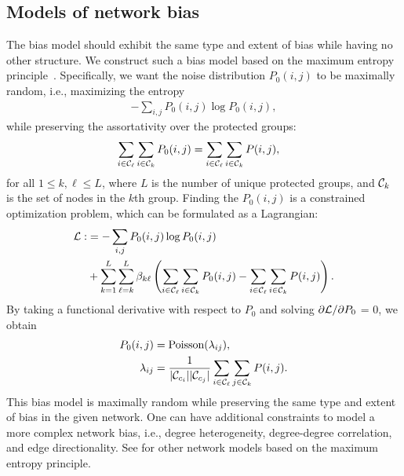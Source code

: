 \documentclass{article}
\theoremstyle{plain}
\theoremstyle{definition}
\theoremstyle{remark}
\begin{document}
\subsection{Models of network bias}

The bias model should exhibit the same type and extent of bias while having no other structure.
We construct such a bias model based on the maximum entropy principle~\cite{cimini2019statistical,bardoscia2021physics}.
Specifically, we want the noise distribution $P_0(i,j)$ to be maximally random, i.e., maximizing the entropy  
\begin{align}
-\sum_{i,j} P_0(i,j) \log P_0(i,j),
\end{align}
while preserving the assortativity over the protected groups:
\begin{align}
\sum_{i \in {\cal C}_\ell}\sum_{i \in {\cal C}_k} P_0(i,j) &= \sum_{i \in {\cal C}_\ell}\sum_{i \in {\cal C}_k}P(i,j),
\end{align}
for all $1 \leq k, \ell \leq L$, where $L$ is the number of unique protected groups, and ${\cal C}_k$ is the set of nodes in the $k$th group. 
Finding the $P_0(i,j)$ is a constrained optimization problem, which can be formulated as a Lagrangian:
\begin{align}
{\cal L}:&= -\sum_{i,j} P_0(i,j) \log P_0(i,j) \nonumber \\
&+ \sum_{k=1}^L\sum_{\ell=k}^L \beta_{k\ell}
\left( 
\sum_{i \in {\cal C}_\ell}\sum_{i \in {\cal C}_k} P_0(i,j) - \sum_{i \in {\cal C}_\ell}\sum_{i \in {\cal C}_k}P(i,j) \right).
\end{align}
By taking a functional derivative with respect to $P_0$ and solving 
$\partial {\cal L}/\partial P_0$ = 0, we obtain
\begin{align}
P_0(i,j) &= \text{Poisson}(\lambda_{ij}), \\
\lambda_{ij} &= \frac{1}{|{\cal C}_{c_i}||{\cal C}_{c_j}|}\sum_{i \in {\cal C}_\ell}\sum_{j \in {\cal C}_k} P(i,j).
\end{align}
This bias model is maximally random while preserving the same type and extent of bias in the given network. 
One can have additional constraints to model a more complex network bias, i.e., degree heterogeneity, degree-degree correlation, and edge directionality. 
See \cite{cimini2019statistical,bardoscia2021physics} for other network models based on the maximum entropy principle. 
\end{document}
